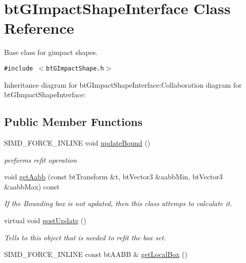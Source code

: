 \hypertarget{classbt_g_impact_shape_interface}{
\section{btGImpactShapeInterface Class Reference}
\label{classbt_g_impact_shape_interface}
}
Base class for gimpact shapes.  


{\tt \#include $<$btGImpactShape.h$>$}

Inheritance diagram for btGImpactShapeInterface:Collaboration diagram for btGImpactShapeInterface:\subsection*{Public Member Functions}
\begin{CompactItemize}
\item 
SIMD\_\-FORCE\_\-INLINE void \hyperlink{classbt_g_impact_shape_interface_cb26c2d7a2aecabd06b996b72b848492}{updateBound} ()
\begin{CompactList}\small\item\em performs refit operation \item\end{CompactList}\item 
void \hyperlink{classbt_g_impact_shape_interface_418d1f35f4dd58e4d3195aee639b615b}{getAabb} (const btTransform \&t, btVector3 \&aabbMin, btVector3 \&aabbMax) const 
\begin{CompactList}\small\item\em If the Bounding box is not updated, then this class attemps to calculate it. \item\end{CompactList}\item 
\hypertarget{classbt_g_impact_shape_interface_c430754948ac92d6f70b81e88416c96a}{
virtual void \hyperlink{classbt_g_impact_shape_interface_c430754948ac92d6f70b81e88416c96a}{postUpdate} ()}
\label{classbt_g_impact_shape_interface_c430754948ac92d6f70b81e88416c96a}

\begin{CompactList}\small\item\em Tells to this object that is needed to refit the box set. \item\end{CompactList}\item 
\hypertarget{classbt_g_impact_shape_interface_d4f12ac5c91bf67349109aecdec65455}{
SIMD\_\-FORCE\_\-INLINE const btAABB \& \hyperlink{classbt_g_impact_shape_interface_d4f12ac5c91bf67349109aecdec65455}{getLocalBox} ()}
\label{classbt_g_impact_shape_interface_d4f12ac5c91bf67349109aecdec65455}


\end{CompactItemize}
